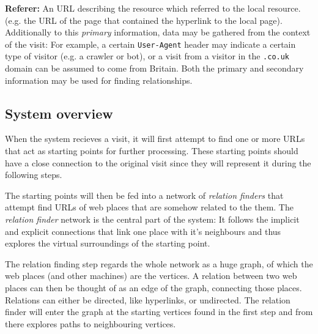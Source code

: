 \documentclass[a4paper]{danarticle}
\theoremstyle{remark}
\begin{document}
    \textbf{Referer:} An URL describing the resource which referred to the local 
    resource. (e.g. the URL of the page that contained the hyperlink to the 
    local page).
    \\
    
    Additionally to
    this \textit{primary} information, data may be gathered from the
    context of the visit: For example, a certain \verb$User-Agent$ header 
    may indicate a certain type of visitor (e.g. a crawler or bot), or a visit
    from a visitor in the \verb$.co.uk$ domain can be assumed to come from
    Britain. Both the primary and secondary information may be used for finding
    relationships.
    \subsection{System overview}
      When the system recieves a visit, it will first attempt to find one or 
      more URLs that act as starting points for further processing. These 
      starting points should have a close connection to the original visit since 
      they will represent it during the following steps.
      
      The starting points will then be fed into a network of \textit{relation 
      finders} that attempt find URLs of web places that are somehow related to 
      the them. The \textit{relation finder} network is the central part of the 
      system: It follows the implicit and explicit connections that link one 
      place with it's neighbours and thus explores the virtual surroundings of 
      the starting point. 
      
      The relation finding step regards the whole network as a huge graph, of
      which the web places (and other machines) are the vertices. A relation
      between two web places can then be thought of as an edge of the graph,
      connecting those places. Relations can either be directed, like
      hyperlinks, or undirected. The relation finder will enter the graph at the
      starting vertices found in the first step and from there explores paths to
      neighbouring vertices.
      
\end{document}
